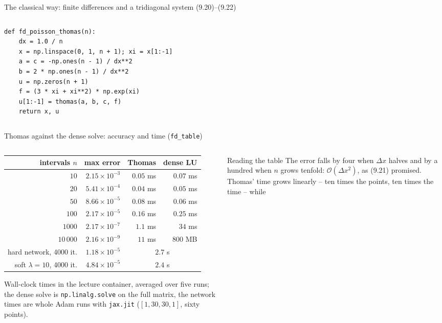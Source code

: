 \documentclass[10pt,aspectratio=169]{beamer}
\begin{document}
\begin{frame}[fragile]{The classical way: finite differences and a tridiagonal system (9.20)--(9.22)}
\begin{columns}[T]
\begin{column}{0.51\textwidth}
\begin{lstlisting}
def fd_poisson_thomas(n):
    dx = 1.0 / n
    x = np.linspace(0, 1, n + 1); xi = x[1:-1]
    a = c = -np.ones(n - 1) / dx**2
    b = 2 * np.ones(n - 1) / dx**2
    u = np.zeros(n + 1)
    f = (3 * xi + xi**2) * np.exp(xi)
    u[1:-1] = thomas(a, b, c, f)
    return x, u
\end{lstlisting}
\end{column}
\end{columns}
\end{frame}

\begin{frame}{Thomas against the dense solve: accuracy and time (\texttt{fd\_table})}
\small
\begin{columns}[T]
\begin{column}{0.5\textwidth}
\begin{center}
\scriptsize
\setlength{\tabcolsep}{4pt}
\begin{tabular}{@{}rrrr@{}}
\toprule
intervals $n$ & max error & Thomas & dense LU\\
\midrule
$10$ & $2.15\times10^{-3}$ & $0.05$ ms & $0.07$ ms\\
$20$ & $5.41\times10^{-4}$ & $0.04$ ms & $0.05$ ms\\
$50$ & $8.66\times10^{-5}$ & $0.08$ ms & $0.06$ ms\\
$100$ & $2.17\times10^{-5}$ & $0.16$ ms & $0.25$ ms\\
$1000$ & $2.17\times10^{-7}$ & $1.1$ ms & $34$ ms\\
$10\,000$ & $2.16\times10^{-9}$ & $11$ ms & $800$ MB\\
\midrule
hard network, 4000 it. & $1.18\times10^{-5}$ & \multicolumn{2}{c}{$2.7$ s}\\
soft $\lambda=10$, 4000 it. & $4.84\times10^{-5}$ & \multicolumn{2}{c}{$2.4$ s}\\
\bottomrule
\end{tabular}
\end{center}
\scriptsize
Wall-clock times in the lecture container, averaged over five runs; the
dense solve is \texttt{np.linalg.solve} on the full matrix, the network
times are whole Adam runs with \texttt{jax.jit} ($[1,30,30,1]$, sixty
points).
\end{column}
\begin{column}{0.48\textwidth}
\begin{block}{Reading the table}
\scriptsize
The error falls by four when $\Delta x$ halves and by a hundred when $n$
grows tenfold: $\mathcal{O}(\Delta x^{2})$, as (9.21) promised.  Thomas'
time grows linearly -- ten times the points, ten times the time -- while

\end{block}
\end{column}
\end{columns}
\end{frame}
\end{document}
